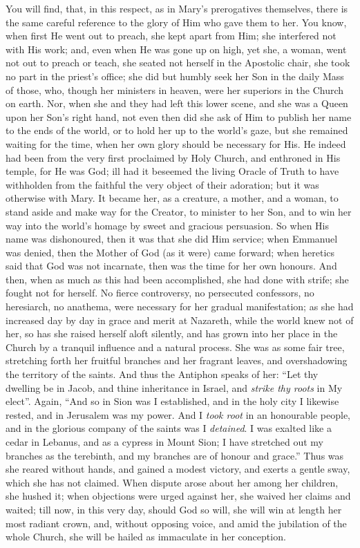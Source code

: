 You will find, that, in this respect, as in Mary's prerogatives
themselves, there is the same careful reference to the glory of Him
who gave them to her. You know, when first He went out to preach, she
kept apart from Him; she interfered not with His work; and, even when
He was gone up on high, yet she, a woman, went not out to preach or
teach, she seated not herself in the Apostolic chair, she took no part
in the priest's office; she did but humbly seek her Son in the daily
Mass of those, who, though her ministers in heaven, were her superiors
in the Church on earth. Nor, when she and they had left this lower
scene, and she was a Queen upon her Son's right hand, not even then
did she ask of Him to publish her name to the ends of the world, or to
hold her up to the world's gaze, but she remained waiting for the
time, when her own glory should be necessary for His. He indeed had
been from the very first proclaimed by Holy Church, and enthroned in
His temple, for He was God; ill had it beseemed the living Oracle of
Truth to have withholden from the faithful the very object of their
adoration; but it was otherwise with Mary. It became her, as a
creature, a mother, and a woman, to stand aside and make way for the
Creator, to minister to her Son, and to win her way into the world's
homage by sweet and gracious persuasion. So when His name was
dishonoured, then it was that she did Him service; when Emmanuel was
denied, then the Mother of God (as it were) came forward; when
heretics said that God was not incarnate, then was the time for her
own honours. And then, when as much as this had been accomplished, she
had done with strife; she fought not for herself. No fierce
controversy, no persecuted confessors, no heresiarch, no anathema,
were necessary for her gradual manifestation; as she had increased day
by day in grace and merit at Nazareth, while the world knew not of
her, so has she raised herself aloft silently, and has grown into her
place in the Church by a tranquil influence and a natural process. She
was as some fair tree, stretching forth her fruitful branches and her
fragrant leaves, and overshadowing the territory of the saints. And
thus the Antiphon speaks of her: ``Let thy dwelling be in Jacob,
and thine inheritance in Israel, and \emph{strike thy roots} in My
elect''. Again, ``And so in Sion was I established, and in the
holy city I likewise rested, and in Jerusalem was my power. And I \emph{took
root} in an honourable people, and in the glorious company of the
saints was I \emph{detained}. I was exalted like a cedar in Lebanus, and as a
cypress in Mount Sion; I have stretched out my branches as the
terebinth, and my branches are of honour and grace.'' Thus was she
reared without hands, and gained a modest victory, and exerts a gentle
sway, which she has not claimed. When dispute arose about her among
her children, she hushed it; when objections were urged against her,
she waived her claims and waited; till now, in this very day, should
God so will, she will win at length her most radiant crown, and,
without opposing voice, and amid the jubilation of the whole Church,
she will be hailed as immaculate in her conception.

